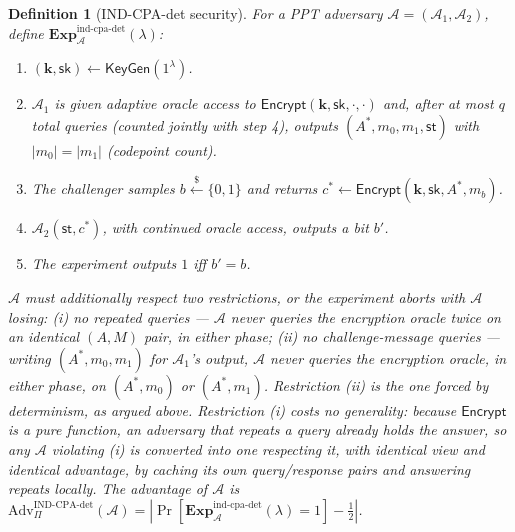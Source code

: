 \documentclass[11pt,a4paper]{article}
\newtheorem{definition}[theorem]{Definition}
\begin{document}
\begin{definition}[IND-CPA-det security]\label{def:ind-cpa-det}
For a PPT adversary $\mathcal{A}=(\mathcal{A}_1,\mathcal{A}_2)$, define
$\mathbf{Exp}^{\mathrm{ind\text{-}cpa\text{-}det}}_{\mathcal{A}}(\lambda)$:
\begin{enumerate}
  \item $(\mathbf{k},\mathsf{sk})\gets\mathsf{KeyGen}(1^\lambda)$.
  \item $\mathcal{A}_1$ is given adaptive oracle access to
        $\mathsf{Encrypt}(\mathbf{k},\mathsf{sk},\cdot,\cdot)$ and, after at
        most $q$ total queries (counted jointly with step 4), outputs
        $(A^*,m_0,m_1,\mathsf{st})$ with $|m_0|=|m_1|$ (codepoint count).
  \item The challenger samples $b\xleftarrow{\$}\{0,1\}$ and returns
        $c^*\gets\mathsf{Encrypt}(\mathbf{k},\mathsf{sk},A^*,m_b)$.
  \item $\mathcal{A}_2(\mathsf{st},c^*)$, with continued oracle access,
        outputs a bit $b'$.
  \item The experiment outputs $1$ iff $b'=b$.
\end{enumerate}
$\mathcal{A}$ must additionally respect two restrictions, or the experiment
aborts with $\mathcal{A}$ losing: (i) \emph{no repeated queries} — $\mathcal{A}$
never queries the encryption oracle twice on an identical $(A,M)$ pair, in
either phase; (ii) \emph{no challenge-message queries} — writing
$(A^*,m_0,m_1)$ for $\mathcal{A}_1$'s output, $\mathcal{A}$ never queries
the encryption oracle, in either phase, on $(A^*,m_0)$ or $(A^*,m_1)$.
Restriction (ii) is the one forced by determinism, as argued above.
Restriction (i) costs no generality: because $\mathsf{Encrypt}$ is a pure
function, an adversary that repeats a query already holds the answer, so
any $\mathcal{A}$ violating (i) is converted into one respecting it, with
identical view and identical advantage, by caching its own
query/response pairs and answering repeats locally.
The advantage of $\mathcal{A}$ is
$\mathrm{Adv}^{\mathrm{IND\text{-}CPA\text{-}det}}_{\Pi}(\mathcal{A}) =
|\Pr[\mathbf{Exp}^{\mathrm{ind\text{-}cpa\text{-}det}}_{\mathcal{A}}(\lambda)=1]-\tfrac12|$.
\end{definition}
\end{document}
